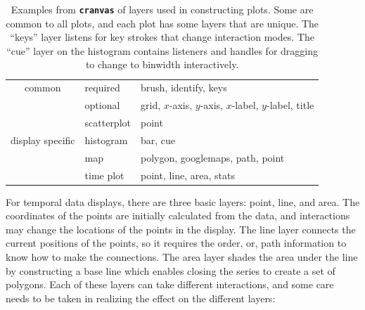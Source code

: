 \documentclass[12pt]{article}
\providecommand{\tabularnewline}{\\}
\begin{document}
\begin{center}
\begin{table}[h]
\begin{centering}
\begin{tabular}{c|l|l}
\hline 
common & required & brush, identify, keys\tabularnewline
\cline{2-3} 
 & optional & grid, $x$-axis, $y$-axis, $x$-label, $y$-label, title \tabularnewline
\hline 
  & scatterplot & point\tabularnewline
\cline{2-3} 
display specific & histogram & bar, cue\tabularnewline
\cline{2-3} 
 & map & polygon, googlemaps, path, point\tabularnewline
\cline{2-3} 
 & time plot & point, line, area, stats\tabularnewline
\hline 
\end{tabular}
\end{centering}

\caption{\label{tab:Layers}Examples from \texttt{\textbf{cranvas}} of layers used in constructing plots. Some are common to all plots, and each plot has some layers that are unique. The ``keys'' layer listens for key strokes that change interaction modes. The ``cue'' layer on the histogram contains listeners and handles for dragging to change to binwidth interactively.}
\end{table}

\end{center}






For temporal data displays, there are three basic layers: point, line, and area. The coordinates of the points are initially calculated from the data, and interactions may change the locations of the points in the display. The line layer connects the current positions of the points, so it requires the order, or, path information to know how to make the connections. The area layer shades the area under the line by constructing a base line which enables closing the series to create a set of polygons.  %
Each of these layers can take different interactions, and some care needs to be taken in realizing the effect on the different layers:
\end{document}
